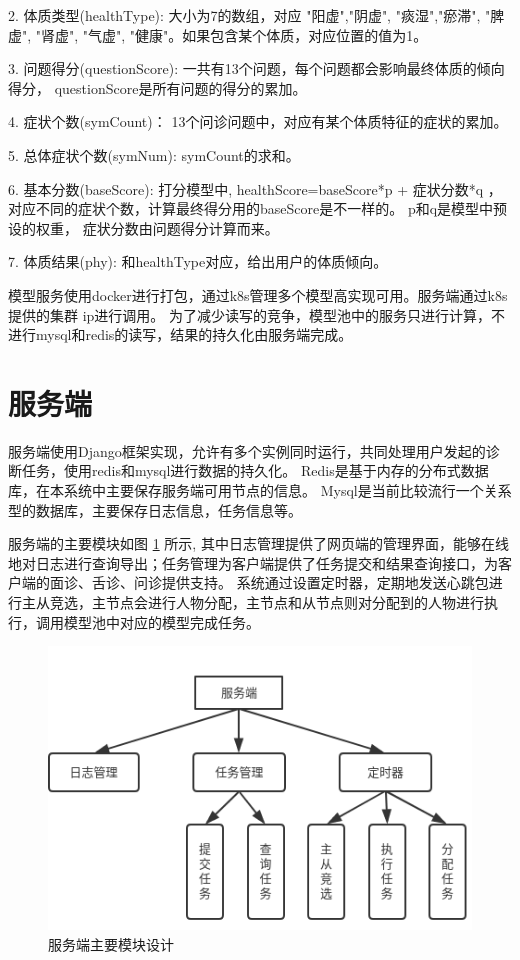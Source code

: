 2. 体质类型(healthType): 大小为7的数组，对应 "阳虚","阴虚", "痰湿","瘀滞", "脾虚", "肾虚", "气虚", "健康"。如果包含某个体质，对应位置的值为1。

3. 问题得分(questionScore): 一共有13个问题，每个问题都会影响最终体质的倾向得分， questionScore是所有问题的得分的累加。

4. 症状个数(symCount)： 13个问诊问题中，对应有某个体质特征的症状的累加。

5. 总体症状个数(symNum): symCount的求和。

6. 基本分数(baseScore): 打分模型中, healthScore=baseScore*p + 症状分数*q ，对应不同的症状个数，计算最终得分用的baseScore是不一样的。 
p和q是模型中预设的权重， 症状分数由问题得分计算而来。

7. 体质结果(phy): 和healthType对应，给出用户的体质倾向。



模型服务使用docker进行打包，通过k8s管理多个模型高实现可用。服务端通过k8s提供的集群 ip进行调用。
为了减少读写的竞争，模型池中的服务只进行计算，不进行mysql和redis的读写，结果的持久化由服务端完成。

\section{服务端}

服务端使用Django框架实现，允许有多个实例同时运行，共同处理用户发起的诊断任务，使用redis和mysql进行数据的持久化。
Redis是基于内存的分布式数据库，在本系统中主要保存服务端可用节点的信息。
Mysql是当前比较流行一个关系型的数据库，主要保存日志信息，任务信息等。

服务端的主要模块如图 \ref{fig:server} 所示, 其中日志管理提供了网页端的管理界面，能够在线地对日志进行查询导出；任务管理为客户端提供了任务提交和结果查询接口，为客户端的面诊、舌诊、问诊提供支持。
系统通过设置定时器，定期地发送心跳包进行主从竞选，主节点会进行人物分配，主节点和从节点则对分配到的人物进行执行，调用模型池中对应的模型完成任务。

\begin{figure}[ht]
    \centering
    \includegraphics[width=12cm]{images/server.png}
    \caption{服务端主要模块设计}
    \label{fig:server}
\end{figure}


